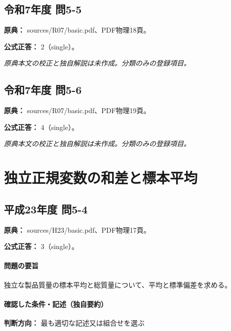 \subsection{令和7年度 問5-5}
\label{q:r07-reg-basic-5-5}

\noindent\textbf{原典：} sources/R07/basic.pdf、PDF物理18頁。

\textbf{公式正答：} 2（single）。

\par\textit{原典本文の校正と独自解説は未作成。分類のみの登録項目。}

\subsection{令和7年度 問5-6}
\label{q:r07-reg-basic-5-6}

\noindent\textbf{原典：} sources/R07/basic.pdf、PDF物理19頁。

\textbf{公式正答：} 4（single）。

\par\textit{原典本文の校正と独自解説は未作成。分類のみの登録項目。}

\section{独立正規変数の和差と標本平均}

\subsection{平成23年度 問5-4}
\label{q:h23-reg-basic-5-4}

\noindent\textbf{原典：} sources/H23/basic.pdf、PDF物理17頁。

\textbf{公式正答：} 3（single）。

\paragraph{問題の要旨} 独立な製品質量の標本平均と総質量について、平均と標準偏差を求める。

\paragraph{確認した条件・記述（独自要約）}\mbox{}\par

\noindent\textbf{判断方向：} 最も適切な記述又は組合せを選ぶ\par

